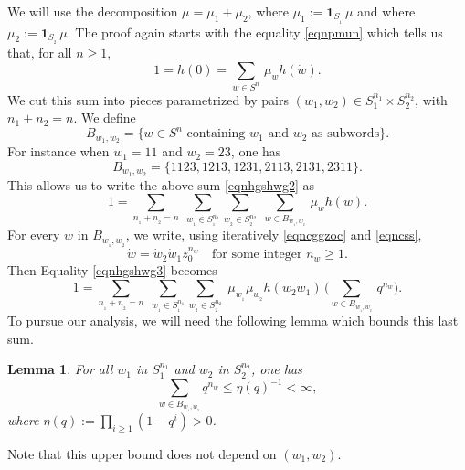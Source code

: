 \documentclass[11pt]{article}
\numberwithin{equation}{section}
\newtheorem{Lem}[Thm]{Lemma}
\theoremstyle{definition}
\begin{document}
We will use the decomposition $\mu=\mu_1+\mu_2$, where $\mu_1:=\mathbf{1}_{S_{_1}}\,\mu$ and
where \hbox{$\mu_2:=\mathbf{1}_{S_{_2}}\,\mu$}.
The proof again starts with the equality \eqref{eqnpmun}
which tells us that, for all $n\geq 1$,
\begin{equation}
\label{eqnhgshwg2}
1=h(0)=
\sum_{w\in S^n}\, \mu_w h(\dot{w}).
\end{equation}
We cut this sum into pieces
parametrized by pairs $(w_1,w_2)\!\in\!S_1^{n_1}\!\times\!S_2^{n_2}$,
with \hbox{$n_1\!+\!n_2\!=\!n$}. We define
\[
B_{w_1,w_2}=\{ w\in S^n \text{ containing $w_1$ and $w_2$ as subwords}\}.
\]
For instance when
$w_1=11$ and $w_2=23$,
one has
\[
B_{w_1,w_2}=\{1123,1213,1231,2113,2131,2311\}.
\]
This allows us to write the above sum \eqref{eqnhgshwg2} as
\begin{equation}
\label{eqnhgshwg3}
1=
\sum_{n_{_1}+n_{_2}=n}\;
\sum_{w_{_1}\in S_{_1}^{n_1}}
\sum_{w_{_2}\in S_{_2}^{n_2}}\;
\sum_{w\in B_{w_{_1}\!,w_{_2}}}\, \mu_w h(\dot{w}).
\end{equation}
For every $w$ in $B_{w_{_1},w_{_2}}$, we write, using iteratively \eqref{eqncggzoc}
and \eqref{eqncss},
\begin{equation}
\label{eqngwgwgw}
\dot{w}=\dot{w}_{2}\dot{w}_{1}z_0^{n_w}
\quad\text{for some integer $n_w\geq 1$}.
\end{equation}
Then Equality \eqref{eqnhgshwg3} becomes
\begin{equation}
\label{eqnhgshwg4}
1=
\sum_{n_{_1}+n_{_2}=n}\;
\sum_{w_{_1}\in S_{_1}^{n_1}}
\sum_{w_{_2}\in S_{_2}^{n_2}}\;
\mu_{w_{_1}} \mu_{w_{_2}} h(\dot{w}_{2}\dot{w}_{1})\,
\biggl(\sum_{w\in B_{w_{_1}\!,w_{_2}}}\,q^{n_w}\biggr).
\end{equation}
To pursue our analysis, we will need the following lemma which
bounds this last sum.

\begin{Lem}
\label{lemsumbww}
For all $w_1$ in $S_1^{n_1}$ and $w_2$ in $S_2^{n_2}$, one has
\begin{equation}
\label{eqnswbwbw}
\sum_{w\in B_{w_{_1}\!,w_{_2}}} q^{n_w}
\leq
\eta(q)^{-1}<\infty,
\end{equation}
where $\eta(q):=\prod\limits_{i\geq 1}(1-q^i)>0$.
\end{Lem}

Note that this upper bound does not depend on $(w_1,w_2)$.
\end{document}
